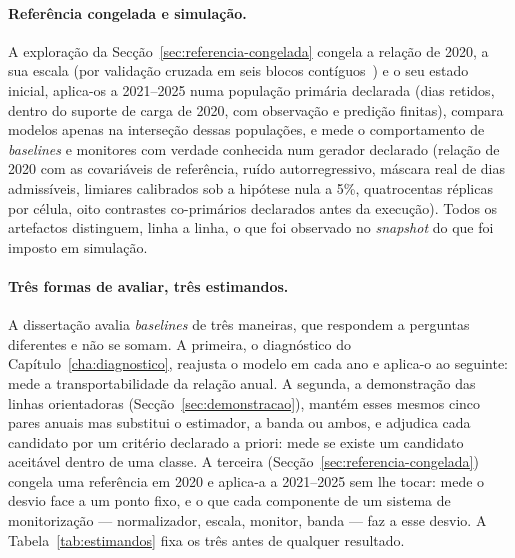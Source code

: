 \paragraph{Referência congelada e simulação.} A exploração da
Secção~\ref{sec:referencia-congelada} congela a relação de 2020, a sua
escala (por validação cruzada em seis blocos contíguos~\cite{BergmeirHyndmanKoo2018})
e o seu estado
inicial, aplica-os a 2021--2025 numa população primária declarada (dias
retidos, dentro do suporte de carga de 2020, com observação e predição
finitas), compara modelos apenas na interseção dessas populações, e mede o
comportamento de \emph{baselines} e monitores com verdade conhecida num
gerador declarado (relação de 2020 com as covariáveis de referência, ruído
autorregressivo, máscara real de dias admissíveis, limiares calibrados sob
a hipótese nula a 5\%, quatrocentas réplicas por célula, oito contrastes
co-primários declarados antes da execução). Todos os artefactos
distinguem, linha a linha, o que foi observado no \emph{snapshot} do que
foi imposto em simulação.

\paragraph{Três formas de avaliar, três estimandos.} A dissertação avalia
\emph{baselines} de três maneiras, que respondem a perguntas diferentes e
não se somam. A primeira, o diagnóstico do Capítulo~\ref{cha:diagnostico},
reajusta o modelo em cada ano e aplica-o ao seguinte: mede a
transportabilidade da relação anual. A segunda, a demonstração das linhas
orientadoras (Secção~\ref{sec:demonstracao}), mantém esses mesmos cinco
pares anuais mas substitui o estimador, a banda ou ambos, e adjudica cada
candidato por um critério declarado a priori: mede se existe um candidato
aceitável dentro de uma classe. A terceira
(Secção~\ref{sec:referencia-congelada}) congela uma referência em 2020 e
aplica-a a 2021--2025 sem lhe tocar: mede o desvio face a um ponto fixo, e o
que cada componente de um sistema de monitorização --- normalizador, escala,
monitor, banda --- faz a esse desvio. A Tabela~\ref{tab:estimandos} fixa os
três antes de qualquer resultado.


